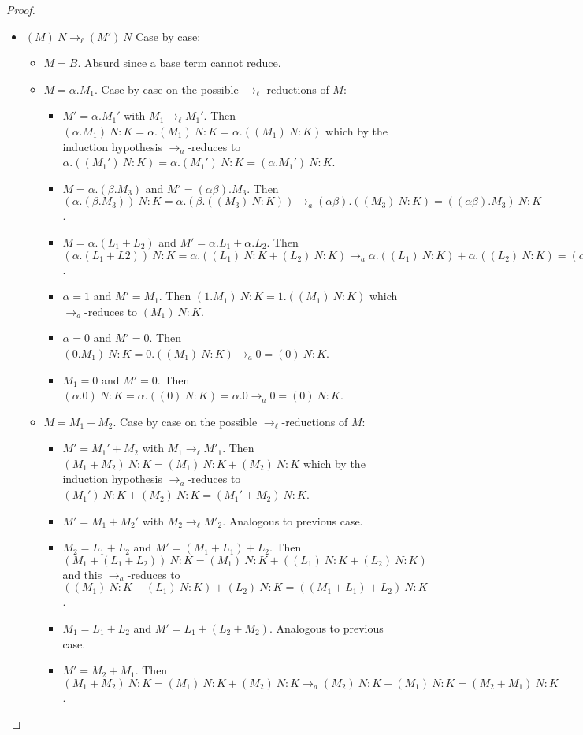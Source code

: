 \documentclass{LMCS}
\newcommand{\xto}[1]{\ensuremath{\rightarrow_{#1}}}
\newcommand{\tolinred}{\xto{\ell}}
\newcommand{\toalgred}{\xto{a}}
\begin{document}
\begin{proof}
\begin{description}
\begin{itemize}
\begin{itemize}
	  \end{itemize}
	\item $(M)~N\tolinred (M')~N$ Case by case:
	  \begin{itemize}
	    \item $M=B$. Absurd since a base term cannot reduce.
	    \item $M=\alpha.M_1$. Case by case on the possible $\tolinred$-reductions of $M$:
	      \begin{itemize}
		\item $M'=\alpha.M_1'$ with $M_1\tolinred M_1'$. Then $(\alpha.M_1)~N:K=\alpha.(M_1)~N:K=\alpha.((M_1)~N:K)$ which by the induction hypothesis $\toalgred$-reduces to $\alpha.((M_1')~N:K)=\alpha.(M_1')~N:K=(\alpha.M_1')~N:K$.
		\item $M=\alpha.(\beta.M_3)$ and $M'=(\alpha\beta).M_3$. Then $(\alpha.(\beta.M_3))~N:K=\alpha.(\beta.((M_3)~N:K))\toalgred(\alpha\beta).((M_3)~N:K)=((\alpha\beta).M_3)~N:K$.
		\item $M=\alpha.(L_1+L_2)$ and $M'=\alpha.L_1+\alpha.L_2$. Then $(\alpha.(L_1+L2))~N:K=\alpha.((L_1)~N:K+(L_2)~N:K)\toalgred\alpha.((L_1)~N:K)+\alpha.((L_2)~N:K)=(\alpha.L_1+\alpha.L2)~N:K$.
		\item $\alpha=1$ and $M'=M_1$. Then $(1.M_1)~N:K=1.((M_1)~N:K)$ which \toalgred-reduces to $(M_1)~N:K$.
		\item $\alpha=0$ and $M'=0$. Then $(0.M_1)~N:K=0.((M_1)~N:K)\toalgred 0=(0)~N:K$.
		\item $M_1=0$ and $M'=0$. Then $(\alpha.0)~N:K=\alpha.((0)~N:K)=\alpha.0\toalgred 0=(0)~N:K$.
	      \end{itemize}
	    \item $M=M_1+M_2$. Case by case on the possible $\tolinred$-reductions of $M$:
	      \begin{itemize}
		\item $M'=M_1'+M_2$ with $M_1\tolinred M'_1$. Then $(M_1+M_2)~N:K=(M_1)~N:K+(M_2)~N:K$ which by the induction hypothesis $\toalgred$-reduces to $(M_1')~N:K+(M_2)~N:K=(M_1'+M_2)~N:K$.
		\item $M'=M_1+M_2'$ with $M_2\tolinred M'_2$. Analogous to previous case.
		\item $M_2=L_1+L_2$ and $M'=(M_1+L_1)+L_2$. Then $(M_1+(L_1+L_2))~N:K=(M_1)~N:K+((L_1)~N:K+(L_2)~N:K)$ and this $\toalgred$-reduces to $((M_1)~N:K+(L_1)~N:K)+(L_2)~N:K=((M_1+L_1)+L_2)~N:K$.
		\item $M_1=L_1+L_2$ and $M'=L_1+(L_2+M_2)$. Analogous to previous case.
		\item $M'=M_2+M_1$. Then $(M_1+M_2)~N:K=(M_1)~N:K+(M_2)~N:K\toalgred (M_2)~N:K+(M_1)~N:K=(M_2+M_1)~N:K$.

\end{itemize}
\end{itemize}
\end{itemize}
\end{description}
\end{proof}
\end{document}
